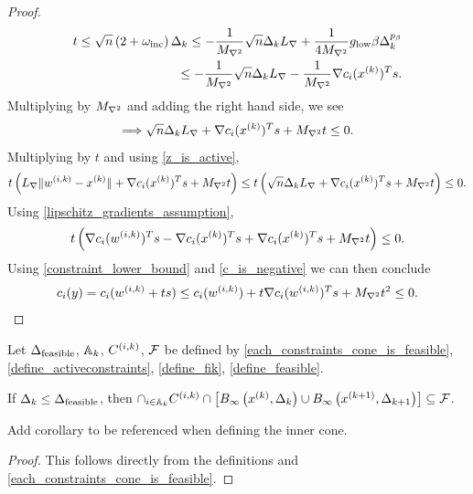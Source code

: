 \begin{proof}
\begin{align*}
t 
\le \sqrt{n} \left(2 + \omega_{\text{inc}} \right) \Delta_k 
\le -\frac 1 {{M_{\nabla^2}}} \sqrt{n}\Delta_k {L_{\nabla}} + \frac 1 {4{M_{\nabla^2}}} { g_{\textrm{low}} } \beta \Delta_k^{p_{\beta}} \\
\le -\frac 1 {{M_{\nabla^2}}} \sqrt{n}\Delta_k {L_{\nabla}} -\frac 1 {{M_{\nabla^2}}} \nabla c_i(x^{(k)})^Ts.
\end{align*}
Multiplying by ${M_{\nabla^2}}$ and adding the right hand side, we see
\begin{align*}
\Longrightarrow \sqrt{n}\Delta_k {L_{\nabla}} + \nabla c_i(x^{(k)})^Ts + {M_{\nabla^2}} t \le 0.
\end{align*}
Multiplying by $t$ and using \cref{z_is_active},
\begin{align*}
 t \left({L_{\nabla}}\|{w^{(i, k)}} - x^{(k)}\| + \nabla c_i(x^{(k)})^Ts + {M_{\nabla^2}} t\right) \le t \left(\sqrt{n}\Delta_k {L_{\nabla}} + \nabla c_i(x^{(k)})^Ts + {M_{\nabla^2}} t\right) \le 0.
\end{align*}
Using \cref{lipschitz_gradients_assumption},
\begin{align*}
t \left(\nabla c_i({w^{(i, k)}})^Ts - \nabla c_i(x^{(k)})^Ts + \nabla c_i(x^{(k)})^Ts + {M_{\nabla^2}} t\right) \le 0.
\end{align*}
Using \cref{constraint_lower_bound} and \cref{c_is_negative} we can then conclude
\begin{align*}
c_i(y) = c_i({w^{(i, k)}} + ts) \le c_i({w^{(i, k)}}) + t\nabla c_i({w^{(i, k)}})^Ts + {M_{\nabla^2}} t^2 \le 0.
\end{align*}

\end{proof}




\begin{lemma}
\label{cone_and_tr_are_feasible}
Let ${\Delta_{\textrm{feasible}}}$, ${\mathbb A_{k}}$, ${C^{(i, k)}}$, ${\mathcal F}$
be defined by
\cref{each_constraints_cone_is_feasible},
\cref{define_activeconstraints},
\cref{define_fik},
\cref{define_feasible}.



If $\Delta_k \le {\Delta_{\textrm{feasible}}}$, then $\cap_{i \in {\mathbb A_{k}}} {C^{(i, k)}} \cap \left[{ B_{\infty}\left(x^{(k)}, \Delta_k\right) } \cup { B_{\infty}\left({{x}^{(k+1)}}, \Delta_{k+1}\right) }\right] \subseteq {\mathcal F}$.
\end{lemma}


\begin{boxedcomment}
Add corollary to be referenced when defining the inner cone.
\end{boxedcomment}

\begin{proof}
This follows directly from the definitions and \cref{each_constraints_cone_is_feasible}.
\end{proof}



